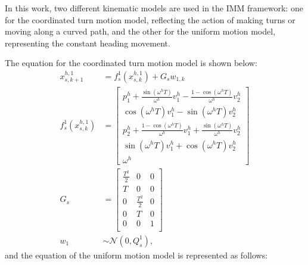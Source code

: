 \documentclass[journal]{IEEEtran}
\begin{document}
	In this work, two different kinematic models are used in the IMM framework: one for the coordinated turn motion model, reflecting the action of making turns or moving along a curved path, and the other for the uniform motion model, representing the constant heading movement. %

	The equation for the coordinated turn motion model is shown below:
	\begin{subequations} \label{eqn:coord_model}
		\begin{align}
			x_{s,k+1}^{h,1}&= f_s^1(x_{s,k}^{h,1})+G_sw_{1,k} \\ 
			f_s^1(x_{s,k}^{h,1})&=\left[
			\begin{array}{c}
				p^h_1+\frac{\sin(\omega^h T)}{\omega^h}v^h_1-\frac{1-\cos(\omega^h T)}{\omega^h}v^h_2\\
				\cos(\omega^h T)v^h_1-\sin(\omega^h T)v^h_2\\
				p^h_2+\frac{1-\cos(\omega^h T)}{\omega^h}v^h_1+\frac{\sin(\omega^h T)}{\omega^h}v^h_2\\
				\sin(\omega^h T)v^h_1+\cos(\omega^h T)v^h_2\\
				\omega^h 
			\end{array}\right] \\
			G_s &= \left[
			\begin{array}{ccc}
				\frac{T^2}{2}& 0& 0\\
				T& 0& 0\\
				0& \frac{T^2}{2}& 0\\
				0& T& 0\\
				0& 0& 1\\                
			\end{array}\right] \\
			w_1&\sim\mathcal{N}(0,Q^1_s),
		\end{align}
	\end{subequations}\normalsize 
    and the equation of the uniform motion model is represented as follows:
\end{document}
